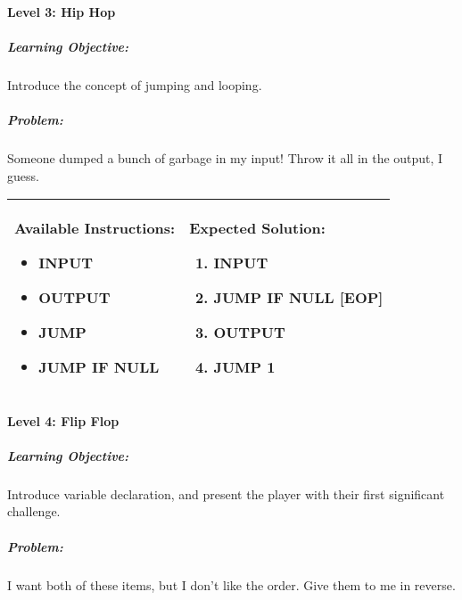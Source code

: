 \paragraph{Level 3: Hip Hop}
\subparagraph{Learning Objective:} Introduce the concept of jumping and looping.

\subparagraph{Problem:} Someone dumped a bunch of garbage in my input! Throw it all in the output, I guess.

\begin{center}
    \begin{tabular}{ | m{5cm} | m{9cm} | } 
        \hline
            \textbf{Available Instructions:} 
            \begin{itemize}
                \setlength\itemsep{-.35em}
                \item INPUT
                \item OUTPUT
                \item JUMP
                \item JUMP IF NULL
            \end{itemize}& 
            \textbf{Expected Solution:} 
            \begin{enumerate}
                \setlength\itemsep{-.35em}
                \item INPUT
                \item JUMP IF NULL [EOP]
                \item OUTPUT
                \item JUMP 1
            \end{enumerate}
            \\
        \hline
    \end{tabular}
\end{center}


\paragraph{Level 4: Flip Flop}
\subparagraph{Learning Objective:} Introduce variable declaration, and present the player with their first significant challenge.

\subparagraph{Problem:} I want both of these items, but I don't like the order. Give them to me in reverse.

